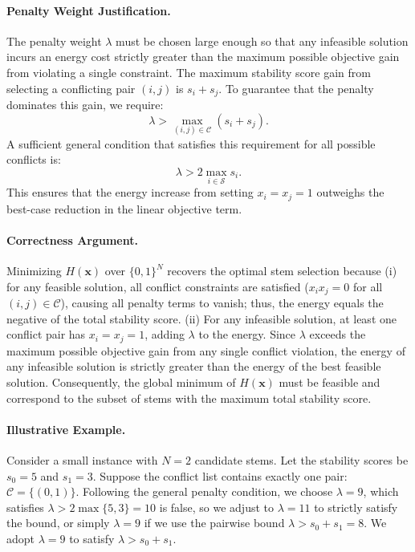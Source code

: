 \documentclass[12pt]{article}
\begin{document}
\paragraph{Penalty Weight Justification.}
The penalty weight $\lambda$ must be chosen large enough so that any infeasible solution incurs an energy cost strictly greater than the maximum possible objective gain from violating a single constraint. The maximum stability score gain from selecting a conflicting pair $(i,j)$ is $s_i + s_j$. To guarantee that the penalty dominates this gain, we require:
\begin{equation}
  \lambda > \max_{(i,j) \in \mathcal{C}} (s_i + s_j).
\end{equation}
A sufficient general condition that satisfies this requirement for all possible conflicts is:
\begin{equation}
  \lambda > 2 \max_{i \in \mathcal{S}} s_i.
\end{equation}
This ensures that the energy increase from setting $x_i = x_j = 1$ outweighs the best-case reduction in the linear objective term.

\paragraph{Correctness Argument.}
Minimizing $H(\mathbf{x})$ over $\{0,1\}^N$ recovers the optimal stem selection because (i) for any feasible solution, all conflict constraints are satisfied ($x_i x_j = 0$ for all $(i,j) \in \mathcal{C}$), causing all penalty terms to vanish; thus, the energy equals the negative of the total stability score. (ii) For any infeasible solution, at least one conflict pair has $x_i = x_j = 1$, adding $\lambda$ to the energy. Since $\lambda$ exceeds the maximum possible objective gain from any single conflict violation, the energy of any infeasible solution is strictly greater than the energy of the best feasible solution. Consequently, the global minimum of $H(\mathbf{x})$ must be feasible and correspond to the subset of stems with the maximum total stability score.

\paragraph{Illustrative Example.}
Consider a small instance with $N=2$ candidate stems. Let the stability scores be $s_0 = 5$ and $s_1 = 3$. Suppose the conflict list contains exactly one pair: $\mathcal{C} = \{(0,1)\}$. Following the general penalty condition, we choose $\lambda = 9$, which satisfies $\lambda > 2 \max\{5, 3\} = 10$ is false, so we adjust to $\lambda = 11$ to strictly satisfy the bound, or simply $\lambda = 9$ if we use the pairwise bound $\lambda > s_0 + s_1 = 8$. We adopt $\lambda = 9$ to satisfy $\lambda > s_0 + s_1$.
\end{document}
